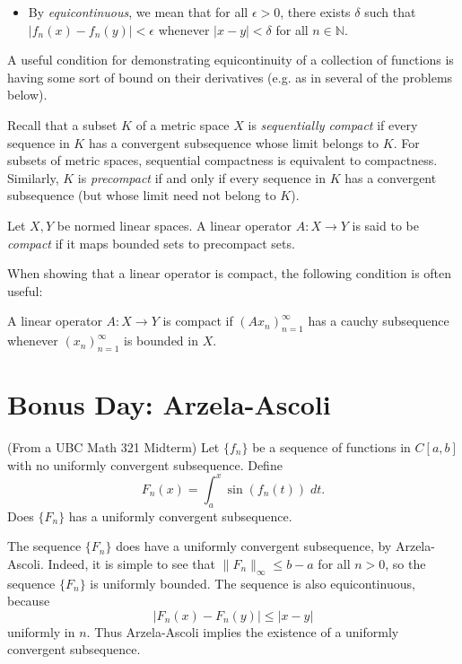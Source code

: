 \documentclass{exam}
\theoremstyle{problemstyle}
\newcommand{\1}[1]{\textbf{1}_{\left[#1\right]}} %
\begin{document}
\begin{questions}
\begin{itemize}
\item By \textit{equicontinuous}, we mean that for all $\epsilon>0$, there exists $\delta$ such that  $|f_n(x)-f_n(y)|<\epsilon$ whenever $|x-y|<\delta$ for all $n\in \mathbb{N}$.

\end{itemize}

A useful condition for demonstrating equicontinuity of a collection of functions is having some sort of bound on their derivatives (e.g. as in several of the problems below).


Recall that a subset $K$ of a metric space $X$ is \textit{sequentially compact} if every sequence in $K$ has a convergent subsequence whose limit belongs to $K$. For subsets of metric spaces, sequential compactness is equivalent to compactness. Similarly, $K$ is \textit{precompact} if and only if every sequence in $K$ has a convergent subsequence (but whose limit need not belong to $K$).


Let $X,Y$ be normed linear spaces. A linear operator $A:X\to Y$ is said to be \textit{compact} if it maps bounded sets to precompact sets.

When showing that a linear operator is compact, the following condition is often useful: 

A linear operator $A:X\to Y$ is compact if $(Ax_n)_{n=1}^{\infty}$ has a cauchy subsequence whenever $(x_n)_{n=1}^{\infty}$ is bounded in $X$.


\newpage
\section{Bonus Day: Arzela-Ascoli}

\question (From a UBC Math 321 Midterm) Let $\{ f_n \}$ be a sequence of functions in $C[a,b]$ with no uniformly convergent subsequence. Define
%
\[ F_n(x) = \int_a^x \sin(f_n(t))\; dt. \]
%
Does $\{ F_n \}$ has a uniformly convergent subsequence.
\begin{solution}
    The sequence $\{ F_n \}$ does have a uniformly convergent subsequence, by Arzela-Ascoli. Indeed, it is simple to see that $\| F_n \|_\infty \leq b - a$ for all $n > 0$, so the sequence $\{ F_n \}$ is uniformly bounded. The sequence is also equicontinuous, because
    \[ |F_n(x) - F_n(y)| \leq |x - y| \]
    uniformly in $n$. Thus Arzela-Ascoli implies the existence of a uniformly convergent subsequence.
\end{solution}



\end{questions}
\end{document}
